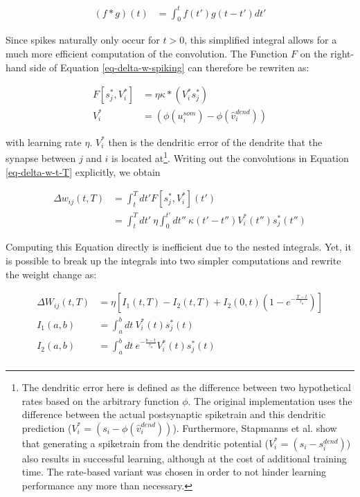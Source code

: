 \begin{align}
  (f \ast g)(t) & = \int_{0}^{t} f(t') g(t-t') d t'
\end{align}

Since spikes naturally only occur for $t>0$, this simplified integral allows for a much more efficient computation of
the convolution. The Function $F$ on the right-hand side of Equation \ref{eq-delta-w-spiking} can therefore be rewriten
as:

\begin{align}
  F[s_j^\ast, V_i^\ast] & = \eta \kappa \ast (V_i^\ast s_j^\ast)        \\
  V_i^\ast              & = (\phi(u_i^{som}) - \phi(\hat{v}_i^{dend}) )
\end{align}

 with learning rate $\eta$. $V_i^\ast$ then is the dendritic error of the dendrite that the
synapse between $j$ and $i$ is located at\footnote{The dendritic error here is defined as the difference between two
hypothetical rates based on the arbitrary function $\phi$. The original implementation uses the difference between the
actual postsynaptic spiketrain and this dendritic prediction ($V_i^\ast = (s_i - \phi(\hat{v}_i^{dend}) )$).
Furthermore, Stapmanns et al. show that generating a spiketrain from the dendritic potential ($V_i^\ast = (s_i -
  s_i^{dend})$) also results in successful learning, although at the cost of additional training time. The rate-based
variant was chosen in order to not hinder learning performance any more than necessary.}. Writing out the convolutions
in Equation \ref{eq-delta-w-t-T} explicitly, we obtain

\begin{align}
  \Delta w_{ij}(t,T) & = \int_t^T dt' F[s_j^\ast, V_i^\ast](t')                                                                           \\
                     & =  \int_t^T dt' \  \eta\int_0^{t'} dt'' \ \kappa(t'-t'') V_i^\ast (t'') s_j^\ast (t'') \label{eq-delta-w-t-T-long}
\end{align}

Computing this Equation directly is inefficient due to the nested integrals. Yet, it is possible to break up the
integrals into two simpler computations and rewrite the weight change as:


\begin{align}
  \Delta W_{ij}(t, T) & = \eta \left[ I_1 (t, T) - I_2(t,T) + I_2(0,t)\left( 1- e^{-\frac{T-t}{\tau_\kappa}} \right) \right] \\
  I_1(a, b)           & = \int_{a}^{b} dt \ V_i^\ast (t) s_j^\ast (t)                                                        \\
  I_2(a, b)           & = \int_{a}^{b} dt \ e^{-\frac{b-t}{\tau_\kappa}} V_i^\ast (t) s_j^\ast (t)                           \\
\end{align}

